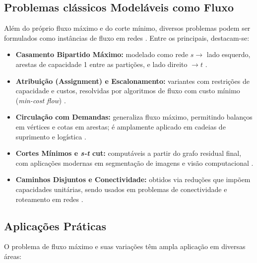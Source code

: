 \documentclass[12pt]{article}
\begin{document}
\subsection{Problemas clássicos Modeláveis como Fluxo} 

Além do próprio fluxo máximo e do corte mínimo, diversos problemas podem ser formulados como instâncias de fluxo em redes \cite{ahuja1993, cormen2009}. Entre os principais, destacam-se: 

\begin{itemize} 
\item \textbf{Casamento Bipartido Máximo:} modelado como rede $s\to$ lado esquerdo, arestas de capacidade 1 entre as partições, e lado direito $\to t$ \cite{hopcroft1973}. 
\item \textbf{Atribuição (Assignment) e Escalonamento:} variantes com restrições de capacidade e custos, resolvidas por algoritmos de fluxo com custo mínimo (\emph{min-cost flow}) \cite{ahuja1993, kleinberg2006}. 
\item \textbf{Circulação com Demandas:} generaliza fluxo máximo, permitindo balanços em vértices e cotas em arestas; é amplamente aplicado em cadeias de suprimento e logística \cite{ahuja1993}. 
\item \textbf{Cortes Mínimos e \emph{s-t} cut:} computáveis a partir do grafo residual final, com aplicações modernas em segmentação de imagens e visão computacional \cite{boykov2001, kolmogorov2004}. 
\item \textbf{Caminhos Disjuntos e Conectividade:} obtidos via reduções que impõem capacidades unitárias, sendo usados em problemas de conectividade e roteamento em redes \cite{ahuja1993}. 
\end{itemize}


\subsection{Aplicações Práticas}

O problema de fluxo máximo e suas variações têm ampla aplicação em diversas áreas:
\end{document}
